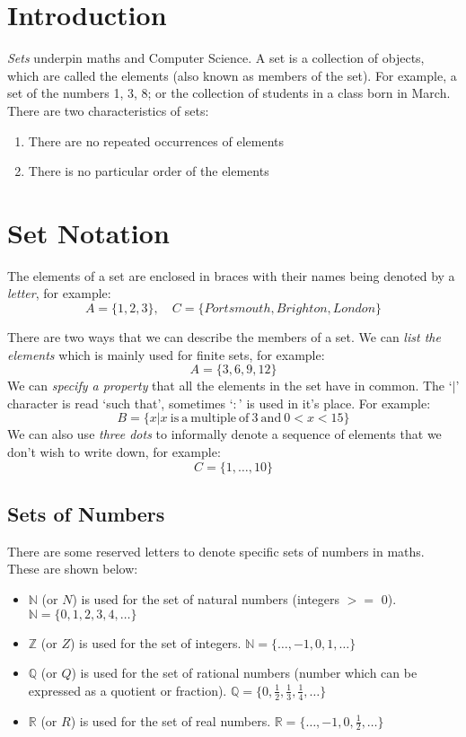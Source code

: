 
\section{Introduction}
\textit{Sets} underpin maths and Computer Science. A set is a collection of objects, which are called the elements (also known as members of the set). For example, a set of the numbers 1, 3, 8; or the collection of students in a class born in March. There are two characteristics of sets:
\begin{enumerate}
    \item There are no repeated occurrences of elements
    \item There is no particular order of the elements
\end{enumerate}

\section{Set Notation}
The elements of a set are enclosed in braces with their names being denoted by a \textit{letter}, for example:
\[A = \{1, 2, 3\}, \quad C=\{Portsmouth, Brighton, London\}\]

There are two ways that we can describe the members of a set. We can \textit{list the elements} which is mainly used for finite sets, for example:
\[A = \{3, 6, 9, 12\}\]
We can \textit{specify a property} that all the elements in the set have in common. The `$|$' character is read `such that', sometimes `$:$' is used in it's place. For example:
\[B = \{x | x \mathrm{\ is\ a\ multiple\ of\ 3\ and\ } 0 < x < 15\}\]
We can also use \textit{three dots} to informally denote a sequence of elements that we don't wish to write down, for example:
\[C = \{1, \ldots, 10\}\]

\subsection{Sets of Numbers}
There are some reserved letters to denote specific sets of numbers in maths. These are shown below:
\begin{itemize}
    \item $\mathbb{N}$ (or $N$) is used for the set of natural numbers (integers $>=$ 0). $\mathbb{N} = \{0, 1, 2, 3, 4, \ldots \}$
    \item $\mathbb{Z}$ (or $Z$) is used for the set of integers. $\mathbb{N} = \{\ldots, -1, 0, 1, \ldots \}$
    \item $\mathbb{Q}$ (or $Q$) is used for the set of rational numbers (number which can be expressed as a quotient or fraction). $\displaystyle \mathbb{Q} = \{0, \frac{1}{2}, \frac{1}{3}, \frac{1}{4}, \ldots \}$
    \item $\mathbb{R}$ (or $R$) is used for the set of real numbers. $\mathbb{R} = \{\displaystyle \ldots, -1, 0, \frac{1}{2}, \ldots \}$
\end{itemize}

